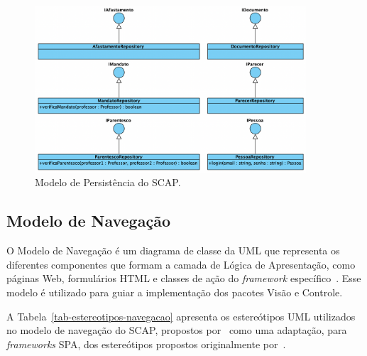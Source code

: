 \begin{figure}[h!]
    \centering
    \includegraphics[width=0.9\textwidth]{figuras/fig-modelo-persist.png}
    \caption{Modelo de Persistência do SCAP.}
    \label{fig-modelo-persist}
\end{figure}



\subsection{Modelo de Navegação}
\label{subsec-frameweb-navegacao}

O Modelo de Navegação é um diagrama de classe da UML que representa os diferentes componentes que
formam a camada de Lógica de Apresentação, como páginas Web, formulários HTML e classes de ação do \textit{framework} específico~\cite{souza:2007}. 
Esse modelo é utilizado para guiar a implementação dos pacotes Visão e Controle.

A Tabela~\ref{tab-estereotipos-navegacao} apresenta os estereótipos UML utilizados no modelo de navegação do SCAP,
propostos por~ como uma adaptação, para \textit{frameworks} SPA,
dos estereótipos propostos originalmente por~.

